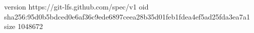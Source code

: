 version https://git-lfs.github.com/spec/v1
oid sha256:95d0b5bdced0e6af36c9ede6897ceea28b35d01feb1fdea4ef5ad25fda3ea7a1
size 1048672
